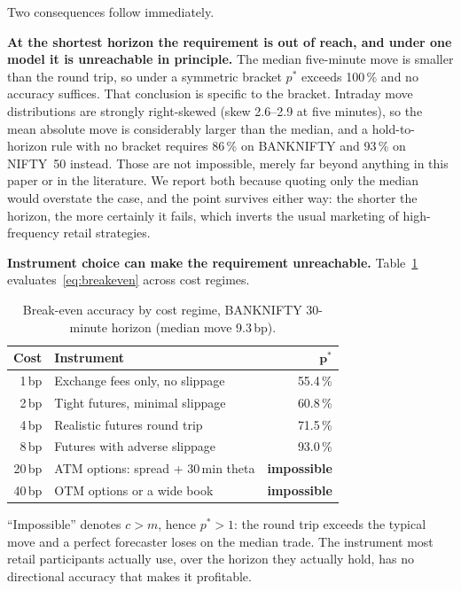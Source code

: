 \documentclass[conference]{IEEEtran}
\begin{document}
Two consequences follow immediately.

\textbf{At the shortest horizon the requirement is out of reach, and under one
model it is unreachable in principle.} The median five-minute move is smaller
than the round trip, so under a symmetric bracket $p^{\ast}$ exceeds 100\,\% and
no accuracy suffices. That conclusion is specific to the bracket. Intraday move
distributions are strongly right-skewed (skew 2.6--2.9 at five minutes), so the
mean absolute move is considerably larger than the median, and a hold-to-horizon
rule with no bracket requires 86\,\% on BANKNIFTY and 93\,\% on NIFTY~50
instead. Those are not impossible, merely far beyond anything in this paper or
in the literature. We report both because quoting only the median would
overstate the case, and the point survives either way: the shorter the horizon,
the more certainly it fails, which inverts the usual marketing of
high-frequency retail strategies.

\textbf{Instrument choice can make the requirement unreachable.}
Table~\ref{tab:sensitivity} evaluates~\eqref{eq:breakeven} across cost regimes.

\begin{table}[!tb]
\caption{Break-even accuracy by cost regime, BANKNIFTY 30-minute horizon
(median move 9.3\,bp).}
\label{tab:sensitivity}
\centering
\small
\begin{tabular}{@{}rlr@{}}
\toprule
\textbf{Cost} & \textbf{Instrument} & $\boldsymbol{p^{\ast}}$ \\
\midrule
1\,bp & Exchange fees only, no slippage & 55.4\,\% \\
2\,bp & Tight futures, minimal slippage & 60.8\,\% \\
4\,bp & Realistic futures round trip & 71.5\,\% \\
8\,bp & Futures with adverse slippage & 93.0\,\% \\
20\,bp & ATM options: spread + 30\,min theta & \textbf{impossible} \\
40\,bp & OTM options or a wide book & \textbf{impossible} \\
\bottomrule
\end{tabular}
\end{table}

``Impossible'' denotes $c > m$, hence $p^{\ast} > 1$: the round trip exceeds the
typical move and a perfect forecaster loses on the median trade. The instrument
most retail participants actually use, over the horizon they actually hold, has
no directional accuracy that makes it profitable.
\end{document}

